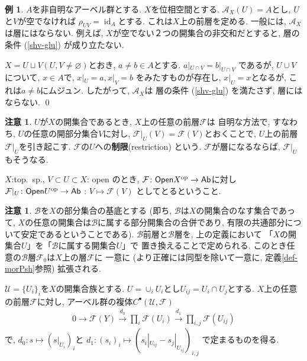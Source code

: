\documentclass[12pt, a4paper, dvipdfmx]{jsarticle}
\makeatletter
\theoremstyle{definition}
\newtheorem{Example}[Axiom]{例}
\newtheorem{Remark}[Axiom]{注意}
\newcommand{\F}{\mathcal{F}}
\newcommand{\mcal}{\mathcal}
\newcommand{\id}{\mathop{\mathrm{id}}\nolimits} %
\numberwithin{equation}{section} %
\newcommand{\op}{{\rm op}} %
\newcommand{\cat}[1]{\textup{\textsf{#1}}}%
\renewenvironment{proof}[1][\proofname]{\par
  \normalfont
  \topsep6\p@\@plus6\p@ \trivlist
  \item[\hskip\labelsep{\textbf{#1}}\@addpunct{\textbf{. }}]\ignorespaces
}{%
  \endtrivlist
}
\renewcommand{\proofname}{証明}
\makeatother
\begin{document}
\begin{Example} \label{ex-Ax}
    $A$を非自明なアーベル群とする. $X$を位相空間とする. 
    $\mcal{A}_X(U) = A$とし, $U$と$V$が空でなければ
    $\rho_{UV}=\id_A$とする. 
    これは$X$上の前層を定める. 
    一般には, $\mcal{A}_X$は層にはならない. 
    例えば, $X$が空でない２つの開集合の非交和だとすると, 
    層の条件 (\ref{shv-glu}) が成り立たない. 
\end{Example}

\begin{proof}
    $X = U \sqcup V (U,V\neq\varnothing)$とおき, 
    $a\neq b\in A$とする. 
    $a|_{U\cap V} = b|_{U\cap V}$
    であるが, $U\cup V$について, 
    $x\in A$で, $x|_U = a, x|_V = b$
    をみたすものが存在し, $x|_U = x$となるが, 
    これは$a\neq b$にムジュン. 
    したがって, $\mcal{A}_X$は
    層の条件 (\ref{shv-glu}) を満たさず, 
    層にはならない. \qed
\end{proof}

\begin{Remark} \label{Rem-rst}
    $U$が$X$の開集合であるとき, $X$上の任意の前層$\F$は
    自明な方法で, すなわち, $U$の任意の開部分集合$V$に対し, 
    $\F|_{U}(V)=\F(V)$とおくことで, 
    $U$上の前層$\F|_{U}$を引き起こす. 
    $\F$の$U$への\textbf{制限}(restriction) という. 
    $\F$が層になるならば, $\F|_{U}$もそうなる. 
\end{Remark}

\begin{proof}[コメント]
    $X$:top.\ sp., $V\subset U\subset X$: open のとき, 
    $\F\colon \cat{Open}X^\op\to \cat{Ab}$に対し
    $\F|_U\colon \cat{Open}U^\op\to \cat{Ab}$ : $V\mapsto \F(V)$
    としてとるということ. 
\end{proof}

\begin{Remark} \label{Rem-Bsh}
    $\mcal{B}$を$X$の部分集合の基底とする 
    (即ち, $\mcal{B}$は$X$の開集合のなす集合であって, 
    $X$の任意の開集合は$\mcal{B}$に属する部分開集合の合併であり, 
    有限の共通部分について安定であるということである). 
    $\mcal{B}$前層と$\mcal{B}$層を, 上の定義において 
    「$X$の開集合$U$」を「$\mcal{B}$に属する開集合$U$」で
    置き換えることで定められる. 
    このとき任意の$\mcal{B}$層$\F_0$は$X$上の層$\F$に
    一意に (より正確には同型を除いて一意に, 
    定義\ref{def-morPsh}参照) 拡張される. 
\end{Remark}

$\mcal{U} = \{U_i\}_i$を$X$の開集合族とする. 
$U = \cup_i U_i$とし$U_{ij} = U_i \cap U_j$とする. 
$X$上の任意の前層$\F$に対し, 
アーベル群の複体$C^\bullet(\mcal{U},\F)$
\begin{align*}
    0 \rightarrow 
    \F(Y) \xrightarrow{d_0} 
    \prod_i \F(U_i) \xrightarrow{d_1} 
    \prod_{i,j} \F(U_{ij})
\end{align*}
で, $d_0\colon s \mapsto (s|_{U_i})_i$と
$d_1\colon (s_i)_i \mapsto(s_i|_{U_{ij}} - s_j|_{U_{ij}})_{i,j}$
で定まるものを得る. 
\end{document}
